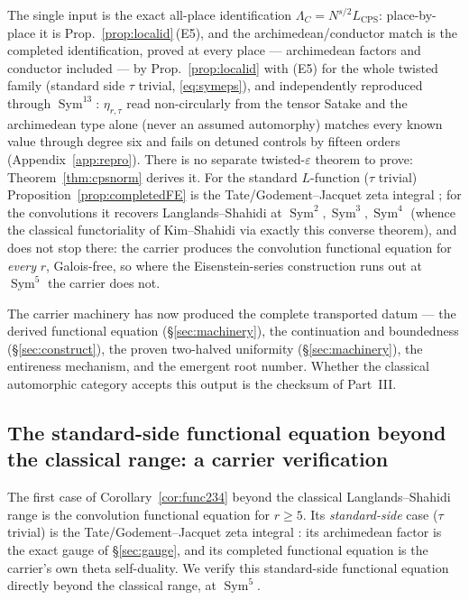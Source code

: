 \documentclass[11pt]{article}
\theoremstyle{definition}
\newcommand{\Sym}{\operatorname{Sym}}
\begin{document}
\noindent The single input is the exact all-place identification $\Lambda_C=N^{s/2}L_{\mathrm{CPS}}$: place-by-place
it is Prop.~\ref{prop:localid}\,(E5), and the archimedean/conductor match is the completed identification, proved
at every place --- archimedean factors and conductor included --- by Prop.~\ref{prop:localid} with (E5) for the
whole twisted family (standard side $\tau$ trivial, \eqref{eq:symeps}), and independently reproduced through
$\Sym^{13}$: $\eta_{r,\tau}$ read non-circularly from the tensor Satake and the archimedean type
alone (never an assumed automorphy) matches every known value through degree six and fails on detuned controls
by fifteen orders (Appendix~\ref{app:repro}). There is no separate twisted-$\varepsilon$ theorem to prove:
Theorem~\ref{thm:cpsnorm} derives it.
For the standard $L$-function ($\tau$ trivial) Proposition~\ref{prop:completedFE} is the
Tate/Godement--Jacquet zeta integral \cite{Tate,GJa}; for the convolutions it recovers Langlands--Shahidi
\cite{Shahidi} at $\Sym^2,\Sym^3,\Sym^4$ (whence the classical functoriality of Kim--Shahidi
\cite{KimShahidi} via exactly this converse theorem), and does not stop there: the carrier produces the
convolution functional equation for \emph{every} $r$, Galois-free, so where the Eisenstein-series
construction runs out at $\Sym^5$ the carrier does not.

The carrier machinery has now produced the complete transported datum --- the derived functional equation
(\S\ref{sec:machinery}), the continuation and boundedness (\S\ref{sec:construct}), the proven two-halved
uniformity (\S\ref{sec:machinery}), the entireness mechanism, and the emergent root number. Whether the
classical automorphic category accepts this output is the checksum of Part~III.


\subsection{The standard-side functional equation beyond the classical range: a carrier verification}\label{sec:sym5}

The first case of Corollary~\ref{cor:func234} beyond the classical Langlands--Shahidi range is the
convolution functional equation for $r\ge5$. Its
\emph{standard-side} case ($\tau$ trivial) is the Tate/Godement--Jacquet zeta integral \cite{Tate,GJa}:
its archimedean factor is the exact gauge of \S\ref{sec:gauge}, and its completed functional equation is
the carrier's own theta self-duality. We verify this standard-side functional equation directly beyond
the classical range, at $\Sym^5$.
\end{document}

